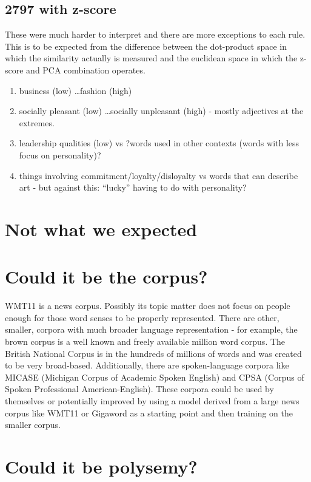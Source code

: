 \documentclass[10pt,letterpaper]{book}
\begin{document}
\subsection{2797 with z-score}

These were much harder to interpret and there are more exceptions to each rule. 
This is to be expected from the difference between the dot-product space in 
which the similarity actually is measured and the euclidean space in which the 
z-score and PCA combination operates.

\begin{enumerate}
 \item business (low) \ldots fashion (high)
 \item socially pleasant (low) \ldots socially unpleasant (high) - mostly 
adjectives at the extremes.
 \item leadership qualities (low) vs ?words used in other contexts (words with 
less focus on personality)?
 \item things involving commitment/loyalty/disloyalty vs words that can 
describe art - but against this: ``lucky'' having to do with personality?
\end{enumerate}


\section{Not what we expected}

\section{Could it be the corpus?}

WMT11 is a news corpus. Possibly its topic matter does not focus on people enough for those word senses to be properly represented. There are other, smaller, corpora with much broader language representation - for example, the brown corpus is a well known and freely available million word corpus. The British National Corpus is in the hundreds of millions of words and was created to be very broad-based. Additionally, there are spoken-language corpora like MICASE (Michigan Corpus of Academic Spoken English) and CPSA (Corpus of Spoken Professional American-English). These corpora could be used by themselves or potentially improved by using a model derived from a large news corpus like WMT11 or Gigaword as a starting point and then training on the smaller corpus.

\section{Could it be polysemy?}
\end{document}
